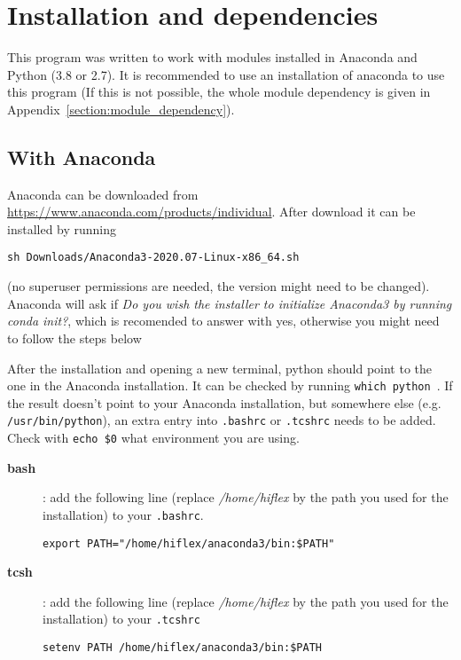 \documentclass[10pt,a4paper]{article}
\begin{document}


\newpage
\section{Installation and dependencies}
\label{Section:installation}

\noindent This program was written to work with modules installed in Anaconda and Python (3.8 or 2.7). It is recommended to use an installation of anaconda to use this program (If this is not possible, the whole module dependency is given in Appendix~\ref{section:module_dependency}).

\subsection{With Anaconda} 
\noindent Anaconda can be downloaded from \url{https://www.anaconda.com/products/individual}. After download it can be installed by running
\begin{lstlisting}[style=base]
sh Downloads/Anaconda3-2020.07-Linux-x86_64.sh
\end{lstlisting}
(no superuser permissions are needed, the version might need to be changed). Anaconda will ask if \textit{Do you wish the installer to initialize Anaconda3 by running conda init?}, which is recomended to answer with yes, otherwise you might need to follow the steps below

After the installation and opening a new terminal, python should point to the one in the Anaconda installation. It can be checked by running \verb|which python|~. %
If the result doesn't point to your Anaconda installation, but somewhere else (e.g. \verb|/usr/bin/python|), an extra entry into \verb|.bashrc| or \verb|.tcshrc| needs to be added. Check with \verb|echo $0| what environment you are using.
\begin{description}
  \item[\textbf{bash}]: add the following line (replace \textit{/home/hiflex} by the path you used for the installation) to your \verb|.bashrc|. %
    \begin{lstlisting}[style=base]
export PATH="/home/hiflex/anaconda3/bin:$PATH"
    \end{lstlisting}
  \item[\textbf{tcsh}]: add the following line (replace \textit{/home/hiflex} by the path you used for the installation) to your \verb|.tcshrc|
    \begin{lstlisting}[style=base]
setenv PATH /home/hiflex/anaconda3/bin:$PATH
    \end{lstlisting}
\end{description}
\end{document}
